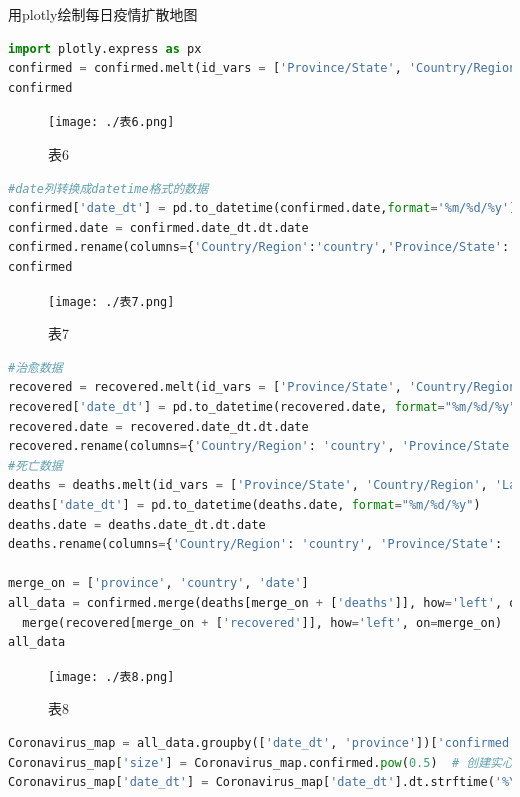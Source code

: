 \documentclass[UTF8,a4paper,12pt]{ctexart}  %
\begin{document}
用plotly绘制每日疫情扩散地图

\begin{lstlisting}[language=Python]
import plotly.express as px
confirmed = confirmed.melt(id_vars = ['Province/State', 'Country/Region', 'Lat', 'Long'], var_name='date',value_name = 'confirmed')
confirmed
\end{lstlisting}

\begin{figure}
\centering
\texttt{[image: ./表6.png]}
\caption{表6}
\end{figure}

\begin{lstlisting}[language=Python]
#date列转换成datetime格式的数据
confirmed['date_dt'] = pd.to_datetime(confirmed.date,format='%m/%d/%y')
confirmed.date = confirmed.date_dt.dt.date
confirmed.rename(columns={'Country/Region':'country','Province/State':'province'},inplace=True)
confirmed
\end{lstlisting}

\begin{figure}
\centering
\texttt{[image: ./表7.png]}
\caption{表7}
\end{figure}

\begin{lstlisting}[language=Python]
#治愈数据
recovered = recovered.melt(id_vars = ['Province/State', 'Country/Region', 'Lat', 'Long'], var_name='date',value_name = 'recovered')
recovered['date_dt'] = pd.to_datetime(recovered.date, format="%m/%d/%y")
recovered.date = recovered.date_dt.dt.date
recovered.rename(columns={'Country/Region': 'country', 'Province/State': 'province'}, inplace=True)
#死亡数据
deaths = deaths.melt(id_vars = ['Province/State', 'Country/Region', 'Lat', 'Long'], var_name='date', value_name = 'deaths')
deaths['date_dt'] = pd.to_datetime(deaths.date, format="%m/%d/%y")
deaths.date = deaths.date_dt.dt.date
deaths.rename(columns={'Country/Region': 'country', 'Province/State': 'province'}, inplace=True)

merge_on = ['province', 'country', 'date']
all_data = confirmed.merge(deaths[merge_on + ['deaths']], how='left', on=merge_on).\
  merge(recovered[merge_on + ['recovered']], how='left', on=merge_on)
all_data
\end{lstlisting}

\begin{figure}
\centering
\texttt{[image: ./表8.png]}
\caption{表8}
\end{figure}

\begin{lstlisting}[language=Python]
Coronavirus_map = all_data.groupby(['date_dt', 'province'])['confirmed', 'deaths','recovered', 'Lat', 'Long'].max().reset_index()
Coronavirus_map['size'] = Coronavirus_map.confirmed.pow(0.5)  # 创建实心圆大小
Coronavirus_map['date_dt'] = Coronavirus_map['date_dt'].dt.strftime('%Y-%m-%d')
\end{lstlisting}
\end{document}
